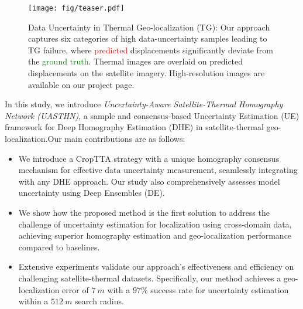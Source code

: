 \begin{figure*}[]
    \centering
    \texttt{[image: fig/teaser.pdf]}
    \caption{Data Uncertainty in Thermal Geo-localization (TG): Our approach captures six categories of high data-uncertainty samples leading to TG failure, where \textcolor{red}{predicted} displacements significantly deviate from the \textcolor{green}{ground truth}. Thermal images are overlaid on predicted displacements on the satellite imagery. High-resolution images are available on our project page.}
    \label{teaser}
    \vspace{-15pt}
\end{figure*}

In this study, we introduce \textit{Uncertainty-Aware Satellite-Thermal Homography Network (UASTHN)}, a sample and consensus-based Uncertainty Estimation (UE) framework for Deep Homography Estimation (DHE) in satellite-thermal geo-localization.Our main contributions are as follows:
\begin{itemize}
\item We introduce a CropTTA strategy with a unique homography consensus mechanism for effective data uncertainty measurement, seamlessly integrating with any DHE approach. Our study also comprehensively assesses model uncertainty using Deep Ensembles (DE).
\item We show how the proposed method is the first solution to address the challenge of uncertainty estimation for localization using cross-domain data, achieving superior homography estimation and geo-localization performance compared to baselines.
\item Extensive experiments validate our approach's effectiveness and efficiency on challenging satellite-thermal datasets. Specifically, our method achieves a geo-localization error of $7~\si{m}$ with a $97\%$ success rate for uncertainty estimation within a $512~\si{m}$ search radius.
\end{itemize}







